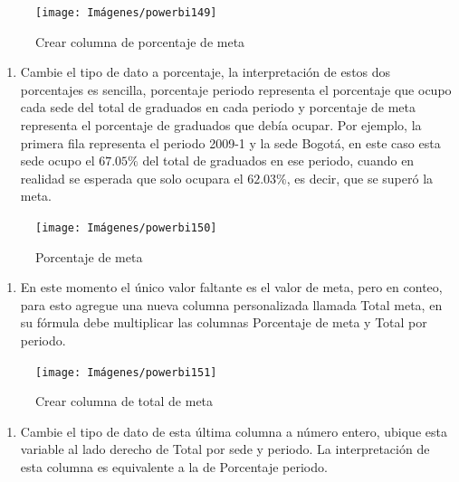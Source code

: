 \documentclass[
]{book}
\providecommand{\tightlist}{%
  \setlength{\itemsep}{0pt}\setlength{\parskip}{0pt}}
\begin{document}
\begin{figure}

{\centering \texttt{[image: Imágenes/powerbi149]} 

}

\caption{Crear columna de porcentaje de meta}\label{fig:porcentajedemeta-fig}
\end{figure}

\begin{enumerate}
\def\labelenumi{\arabic{enumi}.}
\setcounter{enumi}{18}
\tightlist
\item
  Cambie el tipo de dato a porcentaje, la interpretación de estos dos porcentajes es sencilla, porcentaje periodo representa el porcentaje que ocupo cada sede del total de graduados en cada periodo y porcentaje de meta representa el porcentaje de graduados que debía ocupar. Por ejemplo, la primera fila representa el periodo 2009-1 y la sede Bogotá, en este caso esta sede ocupo el \(67.05\%\) del total de graduados en ese periodo, cuando en realidad se esperada que solo ocupara el \(62.03\%\), es decir, que se superó la meta.
\end{enumerate}

\begin{figure}

{\centering \texttt{[image: Imágenes/powerbi150]} 

}

\caption{Porcentaje de meta}\label{fig:porccentajedemetaenlabase-fig}
\end{figure}

\begin{enumerate}
\def\labelenumi{\arabic{enumi}.}
\setcounter{enumi}{19}
\tightlist
\item
  En este momento el único valor faltante es el valor de meta, pero en conteo, para esto agregue una nueva columna personalizada llamada Total meta, en su fórmula debe multiplicar las columnas Porcentaje de meta y Total por periodo.
\end{enumerate}

\begin{figure}

{\centering \texttt{[image: Imágenes/powerbi151]} 

}

\caption{Crear columna de total de meta}\label{fig:totaldemeta-fig}
\end{figure}

\begin{enumerate}
\def\labelenumi{\arabic{enumi}.}
\setcounter{enumi}{20}
\tightlist
\item
  Cambie el tipo de dato de esta última columna a número entero, ubique esta variable al lado derecho de Total por sede y periodo. La interpretación de esta columna es equivalente a la de Porcentaje periodo.
\end{enumerate}
\end{document}
